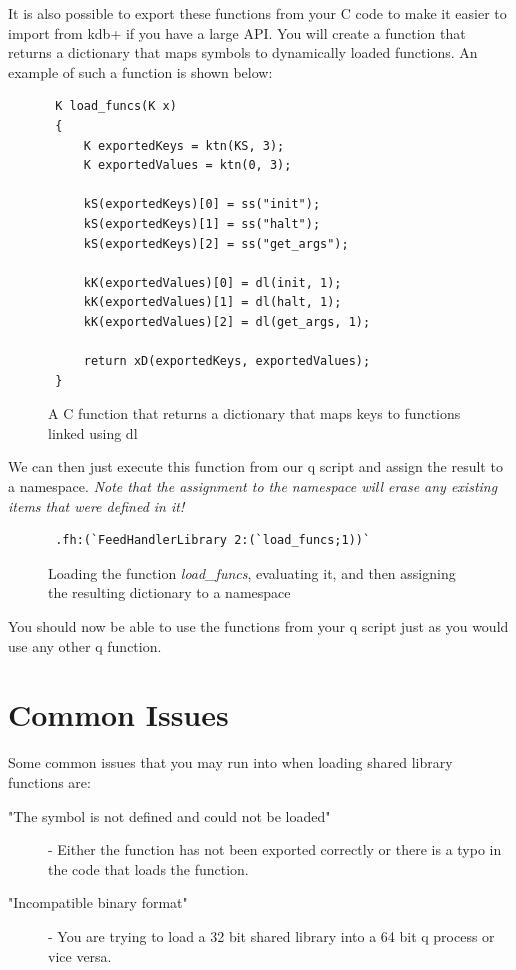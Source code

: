  It is also possible to export these functions from your C code to make it easier to import from kdb+ if you have a large API. You will create a function that returns a dictionary that maps symbols to dynamically loaded functions. An example of such a function is shown below:
 
 \begin{figure}[h]
 \begin{lstlisting}
 K load_funcs(K x)
 {
	 K exportedKeys = ktn(KS, 3);
	 K exportedValues = ktn(0, 3);
 
	 kS(exportedKeys)[0] = ss("init");
	 kS(exportedKeys)[1] = ss("halt");
	 kS(exportedKeys)[2] = ss("get_args");
 
	 kK(exportedValues)[0] = dl(init, 1);
	 kK(exportedValues)[1] = dl(halt, 1);
	 kK(exportedValues)[2] = dl(get_args, 1);
 
	 return xD(exportedKeys, exportedValues);
 }
 \end{lstlisting}
 \caption{A C function that returns a dictionary that maps keys to functions linked using dl}
 \end{figure}
 
 We can then just execute this function from our q script and assign the result to a namespace. \textit{Note that the assignment to the namespace will erase any existing items that were defined in it!}
 
 \begin{figure}[h]
 \begin{lstlisting}
 .fh:(`FeedHandlerLibrary 2:(`load_funcs;1))`
 \end{lstlisting}
 \caption{Loading the function \textit{load\_funcs}, evaluating it, and then assigning the resulting dictionary to a namespace}
 \end{figure}
 
 You should now be able to use the functions from your q script just as you would use any other q function. 
 
 \section{Common Issues}
 
 Some common issues that you may run into when loading shared library functions are:
 
 \begin{description}
 	\item["The symbol is not defined and could not be loaded"] - Either the function has not been exported correctly or there is a typo in the code that loads the function.
 	
 	\item["Incompatible binary format"] - You are trying to load a 32 bit shared library into a 64 bit q process or vice versa.
 \end{description}
